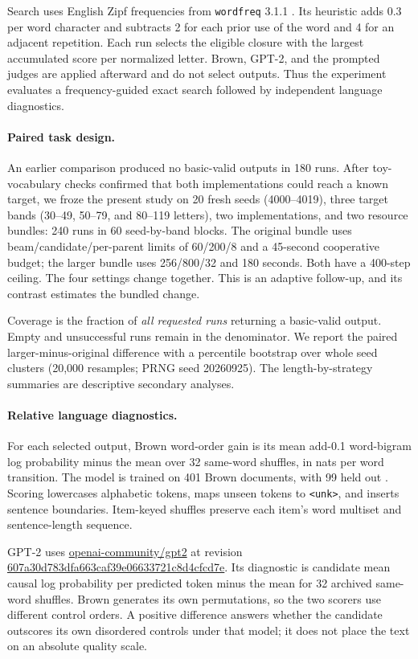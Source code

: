 \documentclass[11pt]{article}
\newcommand{\code}[1]{\texttt{#1}}
\begin{document}
Search uses English Zipf frequencies from \code{wordfreq} 3.1.1 \citep{speer-2022-wordfreq}. Its heuristic adds 0.3 per word character and subtracts 2 for each prior use of the word and 4 for an adjacent repetition. Each run selects the eligible closure with the largest accumulated score per normalized letter. Brown, GPT-2, and the prompted judges are applied afterward and do not select outputs. Thus the experiment evaluates a frequency-guided exact search followed by independent language diagnostics.

\paragraph{Paired task design.}
An earlier comparison produced no basic-valid outputs in 180 runs. After toy-vocabulary checks confirmed that both implementations could reach a known target, we froze the present study on 20 fresh seeds (4000--4019), three target bands (30--49, 50--79, and 80--119 letters), two implementations, and two resource bundles: 240 runs in 60 seed-by-band blocks. The original bundle uses beam/candidate/per-parent limits of 60/200/8 and a 45-second cooperative budget; the larger bundle uses 256/800/32 and 180 seconds. Both have a 400-step ceiling. The four settings change together. This is an adaptive follow-up, and its contrast estimates the bundled change.

Coverage is the fraction of \emph{all requested runs} returning a basic-valid output. Empty and unsuccessful runs remain in the denominator. We report the paired larger-minus-original difference with a percentile bootstrap over whole seed clusters (20,000 resamples; PRNG seed 20260925). The length-by-strategy summaries are descriptive secondary analyses.

\paragraph{Relative language diagnostics.}
For each selected output, Brown word-order gain is its mean add-0.1 word-bigram log probability minus the mean over 32 same-word shuffles, in nats per word transition. The model is trained on 401 Brown documents, with 99 held out \citep{kucera-francis-1967,loper-bird-2002-nltk}. Scoring lowercases alphabetic tokens, maps unseen tokens to \code{<unk>}, and inserts sentence boundaries. Item-keyed shuffles preserve each item's word multiset and sentence-length sequence.

GPT-2 uses \url{openai-community/gpt2} at revision \url{607a30d783dfa663caf39e06633721c8d4cfcd7e}. Its diagnostic is candidate mean causal log probability per predicted token minus the mean for 32 archived same-word shuffles. Brown generates its own permutations, so the two scorers use different control orders. A positive difference answers whether the candidate outscores its own disordered controls under that model; it does not place the text on an absolute quality scale.
\end{document}
